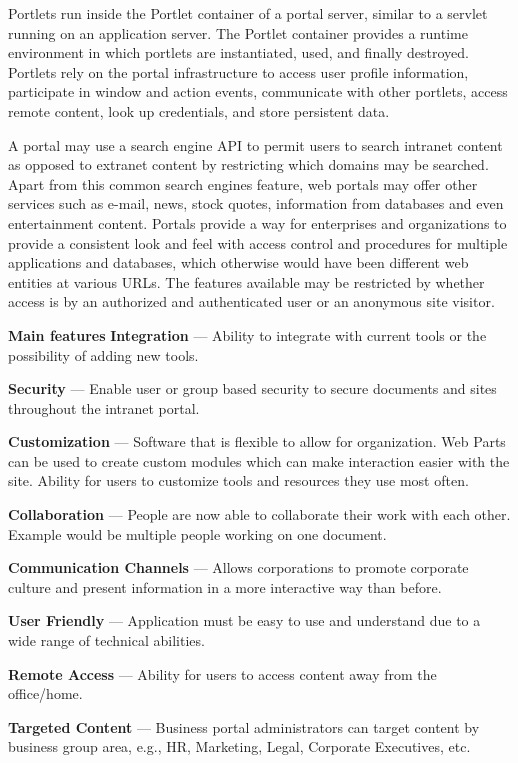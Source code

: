 	Portlets run inside the Portlet container of a portal server, similar to a servlet running on an application server. The Portlet container provides a runtime environment in which portlets are instantiated, used, and finally destroyed. Portlets rely on the portal infrastructure to access user profile information, participate in window and action events, communicate with other portlets, access remote content, look up credentials, and store persistent data.

	A portal may use a search engine API to permit users to search intranet content as opposed to extranet content by restricting which domains may be searched. Apart from this common search engines feature, web portals may offer other services such as e-mail, news, stock quotes, information from databases and even entertainment content. Portals provide a way for enterprises and organizations to provide a consistent look and feel with access control and procedures for multiple applications and databases, which otherwise would have been different web entities at various URLs. The features available may be restricted by whether access is by an authorized and authenticated user or an anonymous site visitor.

		\textbf{Main features}
		\textbf{Integration} — Ability to integrate with current tools or the possibility of adding new tools.

        \textbf{Security} — Enable user or group based security to secure documents and sites throughout the intranet portal.

		\textbf{Customization} — Software that is flexible to allow for organization. Web Parts can be used to create custom modules which can make interaction easier with the site. Ability for users to customize tools and resources they use most often.

		\textbf{Collaboration} — People are now able to collaborate their work with each other. Example would be multiple people working on one document.

		\textbf{Communication Channels} — Allows corporations to promote corporate culture and present information in a more interactive way than before.

		\textbf{User Friendly} — Application must be easy to use and understand due to a wide range of technical abilities.

		\textbf{Remote Access} — Ability for users to access content away from the office/home.

		\textbf{Targeted Content} — Business portal administrators can target content by business group area, e.g., HR, Marketing, Legal, Corporate Executives, etc.


